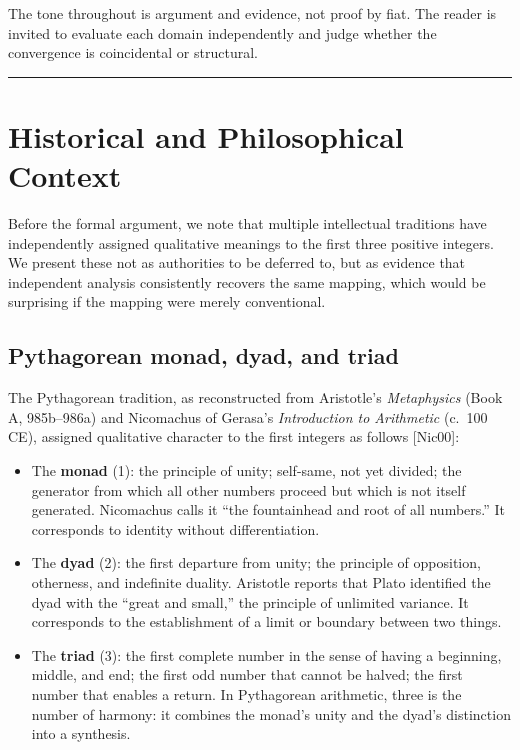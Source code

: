 \documentclass[12pt]{article}
\providecommand{\tightlist}{%
  \setlength{\itemsep}{0pt}\setlength{\parskip}{0pt}}
\begin{document}
The tone throughout is argument and evidence, not proof by fiat. The
reader is invited to evaluate each domain independently and judge
whether the convergence is coincidental or structural.

\begin{center}\rule{0.5\linewidth}{0.5pt}\end{center}

\section{Historical and Philosophical Context}\label{historical-and-philosophical-context}

Before the formal argument, we note that multiple intellectual
traditions have independently assigned qualitative meanings to the first
three positive integers. We present these not as authorities to be
deferred to, but as evidence that independent analysis consistently
recovers the same mapping, which would be surprising if the mapping were
merely conventional.

\subsection{Pythagorean monad, dyad, and triad}\label{pythagorean-monad-dyad-and-triad}

The Pythagorean tradition, as reconstructed from Aristotle's
\emph{Metaphysics} (Book A, 985b--986a) and Nicomachus of Gerasa's
\emph{Introduction to Arithmetic} (c.~100 CE), assigned qualitative
character to the first integers as follows {[}Nic00{]}:

\begin{itemize}
\tightlist
\item
  The \textbf{monad} (1): the principle of unity; self-same, not yet
  divided; the generator from which all other numbers proceed but which
  is not itself generated. Nicomachus calls it ``the fountainhead and
  root of all numbers.'' It corresponds to identity without
  differentiation.
\item
  The \textbf{dyad} (2): the first departure from unity; the principle
  of opposition, otherness, and indefinite duality. Aristotle reports
  that Plato identified the dyad with the ``great and small,'' the
  principle of unlimited variance. It corresponds to the establishment
  of a limit or boundary between two things.
\item
  The \textbf{triad} (3): the first complete number in the sense of
  having a beginning, middle, and end; the first odd number that cannot
  be halved; the first number that enables a return. In Pythagorean
  arithmetic, three is the number of harmony: it combines the monad's
  unity and the dyad's distinction into a synthesis.
\end{itemize}
\end{document}
